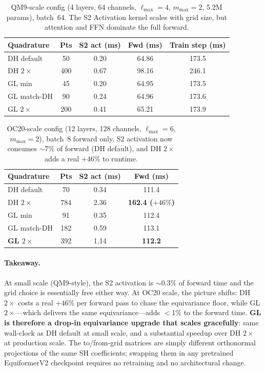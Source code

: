 \documentclass[10pt,twocolumn]{article}
\begin{document}
\begin{table}[t]
  \caption{QM9-scale config (4 layers, 64 channels, $\ell_{\max}{=}4$, $m_{\max}{=}2$,
  5.2M params), batch~64. The S2 Activation kernel scales with grid size, but
  attention and FFN dominate the full forward.}
  \label{tab:speed_small}
  \centering
  \small
  \begin{tabular}{lcccc}
    \toprule
    Quadrature & Pts & S2 act (ms) & Fwd (ms) & Train step (ms) \\
    \midrule
    DH default     & 50  & 0.20 & 64.86 & 173.5 \\
    DH $2\times$   & 400 & 0.67 & 98.16 & 246.1 \\
    GL min         & 45  & 0.20 & 64.95 & 173.5 \\
    GL match-DH    & 90  & 0.24 & 64.96 & 173.6 \\
    GL $2\times$   & 200 & 0.41 & 65.21 & 173.9 \\
    \bottomrule
  \end{tabular}
\end{table}

\begin{table}[t]
  \caption{OC20-scale config (12 layers, 128 channels, $\ell_{\max}{=}6$,
  $m_{\max}{=}2$), batch~8 forward only. S2 activation now consumes
  $\sim$7\% of forward (DH default), and DH $2\times$ adds a real $+46\%$
  to runtime.}
  \label{tab:speed_default}
  \centering
  \small
  \begin{tabular}{lccc}
    \toprule
    Quadrature & Pts & S2 act (ms) & Fwd (ms) \\
    \midrule
    DH default     & 70  & 0.34 & 111.4 \\
    DH $2\times$   & 784 & 2.36 & \textbf{162.4 ($+46\%$)} \\
    GL min         & 91  & 0.35 & 112.4 \\
    GL match-DH    & 182 & 0.59 & 113.1 \\
    \textbf{GL $2\times$}   & 392 & 1.14 & \textbf{112.2} \\
    \bottomrule
  \end{tabular}
\end{table}

\paragraph{Takeaway.}
At small scale (QM9-style), the S2 activation is $\sim$0.3\% of forward time and
the grid choice is essentially free either way. At OC20 scale, the picture
shifts: DH $2\times$ costs a real $+46\%$ per forward pass to chase the
equivariance floor, while GL $2\times$---which delivers the same equivariance---adds
$<$1\% to the forward time. \textbf{GL is therefore a drop-in equivariance upgrade
that scales gracefully}: same wall-clock as DH default at small scale, and a
substantial speedup over DH $2\times$ at production scale. The to/from-grid
matrices are simply different orthonormal projections of the same SH coefficients;
swapping them in any pretrained EquiformerV2 checkpoint requires no retraining
and no architectural change.
\end{document}
